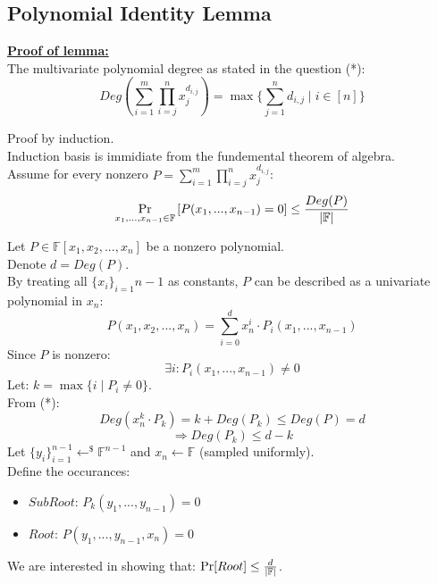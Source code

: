 \subsection{Polynomial Identity Lemma}
\underline{\textbf{Proof of lemma:}}\\
The multivariate polynomial degree as stated in the question (*):
\[
    Deg\left(\sum_{i=1}^m\prod_{i=j}^nx_j^{d_{i,j}}\right) = \max\biggl\{\sum_{j=1}^nd_{i,j}\mid i\in[n]\biggl\}
\]

Proof by induction.\\
Induction basis is immidiate from the fundemental theorem of algebra.\\

Assume for every nonzero $P=\sum_{i=1}^m\prod_{i=j}^nx_j^{d_{i,j}}$:
\[
    \operatorname*{Pr}_{x_1,...,x_{n-1}\in\mathbb{F}}\left[
        P(x_1,...,x_{n-1})=0
    \right]
    \leq \frac{Deg(P)}{|\mathbb{F}|}
\]

Let $P\in\mathbb{F}[x_1, x_2, ..., x_n]$ be a nonzero polynomial.\\
Denote $d=Deg(P)$.\\
By treating all $\{x_i\}_{i=1}^{}n-1$ as constants, $P$ can be described as a univariate polynomial in $x_n$:
\[P(x_1, x_2, ..., x_n)=\sum_{i=0}^dx_n^i\cdot P_i(x_1,...,x_{n-1})\]
Since $P$ is nonzero:
\[
    \exists i: P_i(x_1,...,x_{n-1})\neq 0
\]
Let: $k=\max\{i\mid P_i \neq 0\}$.\\
From (*): 
\[
    Deg(x_n^k\cdot P_k)=k+Deg(P_k)\leq Deg(P)=d
\]\[
    \Rightarrow Deg(P_k)\leq d-k
\]
Let $\{y_i\}_{i=1}^{n-1}\leftarrow^\$ \mathbb{F}^{n-1}$ and $x_n\leftarrow \mathbb{F}$ (sampled uniformly).\\
Define the occurances:
\begin{itemize}
    \item $SubRoot$: $P_k(y_1,...,y_{n-1})=0$
    \item $Root$: $P(y_1,...,y_{n-1},x_n)=0$
\end{itemize}
We are interested in showing that: $\operatorname*{Pr}[Root]\leq\frac{d}{|\mathbb{F}|}$.\\

